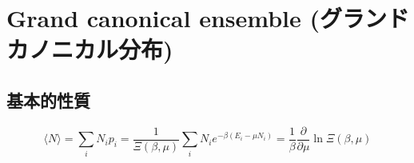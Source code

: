 %
%
%
%
%
\section{Grand canonical ensemble (グランドカノニカル分布)}

\subsection{基本的性質}
\[ \langle N \rangle = \sum_{i} N_i p_i = \frac{1}{\Xi \left( \beta ,\mu  \right)} \sum_i N_i e^{-\beta \left( E_i -\mu N_i \right)} = \frac{1}{\beta } \frac{\partial }{\partial \mu } \ln \Xi \left( \beta ,\mu  \right) \]

